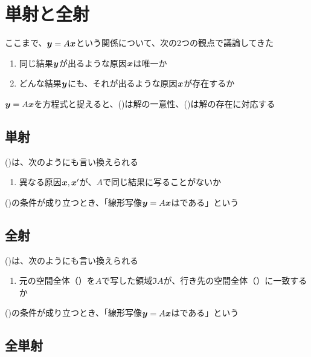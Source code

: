\documentclass[../../../topic_linear-algebra]{subfiles}
\begin{document}
\sectionline
\section{単射と全射}

ここまで、$\vb*{y} = A\vb*{x}$という関係について、次の2つの観点で議論してきた

\begin{enumerate}[label=\romanlabel]
  \item 同じ結果$\vb*{y}$が出るような原因$\vb*{x}$は唯一か
  \item どんな結果$\vb*{y}$にも、それが出るような原因$\vb*{x}$が存在するか
\end{enumerate}

$\vb*{y} = A\vb*{x}$を方程式と捉えると、()は解の一意性、()は解の存在に対応する

\subsection{単射}

()は、次のようにも言い換えられる

\begin{enumerate}[label=\romanlabel]
  \item 異なる原因$\vb*{x},\vb*{x}'$が、$A$で同じ結果に写ることがないか
\end{enumerate}

()の条件が成り立つとき、「線形写像$\vb*{y} = A\vb*{x}$はである」という

\subsection{全射}

()は、次のようにも言い換えられる

\begin{enumerate}[label=\romanlabel,start=2]
  \item 元の空間全体（）を$A$で写した領域$\Im A$が、行き先の空間全体（）に一致するか
\end{enumerate}

()の条件が成り立つとき、「線形写像$\vb*{y} = A\vb*{x}$はである」という

\subsection{全単射}
\end{document}
